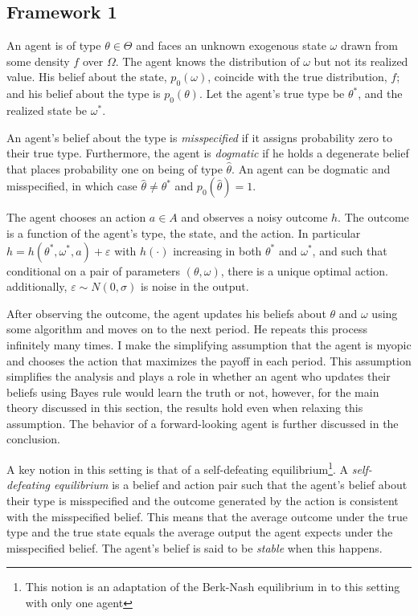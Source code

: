 \documentclass[
  12pt,
]{article}
\begin{document}
\hypertarget{framework-1}{%
\subsection{Framework 1}\label{framework-1}}

An agent is of type \(\theta \in \Theta\) and faces an unknown exogenous
state \(\omega\) drawn from some density \(f\) over \(\Omega\). The
agent knows the distribution of \(\omega\) but not its realized value.
His belief about the state, \(p_0(\omega)\), coincide with the true
distribution, \(f\); and his belief about the type is \(p_0(\theta)\).
Let the agent's true type be \(\theta^{*}\), and the realized state be
\(\omega^{*}\).

An agent's belief about the type is \emph{misspecified} if it assigns
probability zero to their true type. Furthermore, the agent is
\emph{dogmatic} if he holds a degenerate belief that places probability
one on being of type \(\hat{\theta}\). An agent can be dogmatic and
misspecified, in which case \(\hat{\theta} \neq \theta^*\) and
\(p_0(\hat{\theta}) = 1\).

The agent chooses an action \(a\in A\) and observes a noisy outcome
\(h\). The outcome is a function of the agent's type, the state, and the
action. In particular \(h = h(\theta^*, \omega^*, a) + \varepsilon\)
with \(h(\cdot)\) increasing in both \(\theta^*\) and \(\omega^*\), and
such that conditional on a pair of parameters \((\theta, \omega)\),
there is a unique optimal action. additionally,
\(\varepsilon\sim N(0, \sigma)\) is noise in the output.

After observing the outcome, the agent updates his beliefs about
\(\theta\) and \(\omega\) using some algorithm and moves on to the next
period. He repeats this process infinitely many times. I make the
simplifying assumption that the agent is myopic and chooses the action
that maximizes the payoff in each period. This assumption simplifies the
analysis and plays a role in whether an agent who updates their beliefs
using Bayes rule would learn the truth or not, however, for the main
theory discussed in this section, the results hold even when relaxing
this assumption. The behavior of a forward-looking agent is further
discussed in the conclusion.

A key notion in this setting is that of a self-defeating
equilibrium\footnote{This notion is an adaptation of the Berk-Nash equilibrium in 
\citet{Esponda2016} to this setting with only one agent}. A
\emph{self-defeating equilibrium} is a belief and action pair such that
the agent's belief about their type is misspecified and the outcome
generated by the action is consistent with the misspecified belief. This
means that the average outcome under the true type and the true state
equals the average output the agent expects under the misspecified
belief. The agent's belief is said to be \emph{stable} when this
happens.
\end{document}
